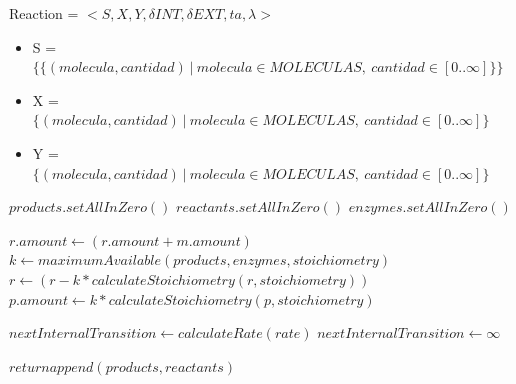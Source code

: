\documentclass[12pt]{article}
\begin{document}
Reaction = $< S, X, Y, \delta INT, \delta EXT, ta, \lambda >$

\begin{itemize}

\item S = $\{ \{ (molecula, cantidad) \ | \ molecula \in MOLECULAS, \ cantidad \in [0..\infty] \} \}$
\item X = $\{ (molecula, cantidad) \ | \ molecula \in MOLECULAS, \ cantidad \in [0..\infty] \}$
\item Y = $\{ (molecula, cantidad) \ | \ molecula \in MOLECULAS, \ cantidad \in [0..\infty] \}$
\end{itemize}

\begin{algorithm}[h]
\begin{algorithmic}[h]
\State $products.setAllInZero()$
\State $reactants.setAllInZero()$
\State $enzymes.setAllInZero()$
\EndFunction
\end{algorithmic}
\end{algorithm}

\begin{algorithm}[h]
\begin{algorithmic}[h]
\State
{}
\State $r.amount \leftarrow (r.amount + m.amount)$
\EndIf
\EndFor
\State
{}
\State $k \leftarrow maximumAvailable(products, enzymes, stoichiometry)$
\State
{}
\State $r \leftarrow (r - k*calculateStoichiometry(r, stoichiometry))$
\EndFor
\State
{}
\State $p.amount \leftarrow k*calculateStoichiometry(p, stoichiometry)$
\EndFor
\EndIf
\EndFunction
\end{algorithmic}
\end{algorithm}

\begin{algorithm}[h]
\begin{algorithmic}[h]
\State
{}
\State $nextInternalTransition \leftarrow calculateRate(rate)$
\Else
\State $nextInternalTransition \leftarrow \infty$
\EndIf
\EndFunction
\end{algorithmic}
\end{algorithm}

\begin{algorithm}[h]
\begin{algorithmic}[h]
\Function{$\lambda$}{ }
\State $return append(products, reactants)$
\EndFunction
\end{algorithmic}
\end{algorithm}
\end{document}
